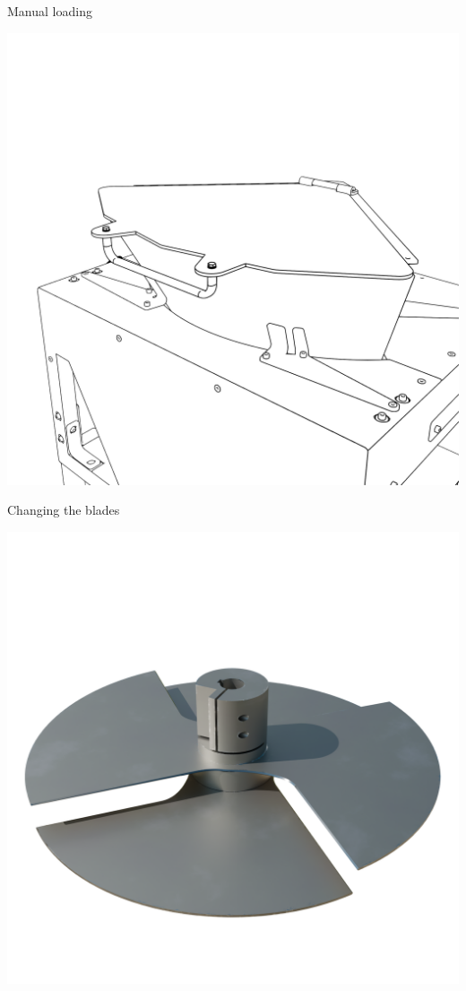 \documentclass[a5paper,portrait]{article}
\begin{document}
\newpage

\newpage
\vspace*{2cm}
        {\color{mainblue}\sffamily\Huge Manual loading}\\[1cm]
\begin{center}
            \includegraphics[width=1\textwidth]{../images/Couvercle_Manuel.png}
\end{center}
\newpage

\newpage
\vspace*{2cm}
        {\color{mainblue}\sffamily\Huge Changing the blades}\\[1cm]
\begin{center}
            \includegraphics[width=1\textwidth]{../images/blades_render.png}
\end{center}
\newpage

\newpage

\newpage



\newpage

\newpage

\newpage


\newpage
\end{document}
